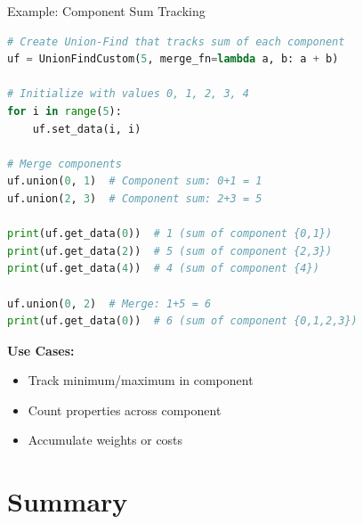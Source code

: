 \documentclass[aspectratio=169]{beamer}
\begin{document}
\begin{frame}[fragile]{Example: Component Sum Tracking}
  \begin{lstlisting}[language=Python, basicstyle=\ttfamily\footnotesize]
# Create Union-Find that tracks sum of each component
uf = UnionFindCustom(5, merge_fn=lambda a, b: a + b)

# Initialize with values 0, 1, 2, 3, 4
for i in range(5):
    uf.set_data(i, i)

# Merge components
uf.union(0, 1)  # Component sum: 0+1 = 1
uf.union(2, 3)  # Component sum: 2+3 = 5

print(uf.get_data(0))  # 1 (sum of component {0,1})
print(uf.get_data(2))  # 5 (sum of component {2,3})
print(uf.get_data(4))  # 4 (sum of component {4})

uf.union(0, 2)  # Merge: 1+5 = 6
print(uf.get_data(0))  # 6 (sum of component {0,1,2,3})
  \end{lstlisting}

  \vspace{0.3cm}
  \textbf{Use Cases:}
  \begin{itemize}
    \item Track minimum/maximum in component
    \item Count properties across component
    \item Accumulate weights or costs
  \end{itemize}
\end{frame}

\section{Summary}
\end{document}
